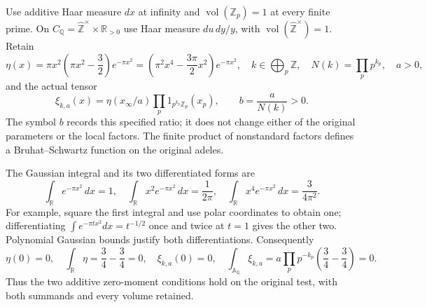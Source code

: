 \documentclass[11pt]{article}
\begin{document}
Use additive Haar measure $dx$ at infinity and
$\operatorname{vol}(\mathbb Z_p)=1$ at every finite prime. On
$C_{\mathbb Q}=\widehat{\mathbb Z}^{\times}\times\mathbb R_{>0}$
use Haar measure $du\,dy/y$, with
$\operatorname{vol}(\widehat{\mathbb Z}^{\times})=1$. Retain
\begin{equation}\tag{ETC1}
 \eta(x)=\pi x^2\left(\pi x^2-\frac32\right)e^{-\pi x^2}
        =\left(\pi^2x^4-\frac{3\pi}{2}x^2\right)e^{-\pi x^2},
 \quad k\in\bigoplus_p\mathbb Z,
 \quad N(k)=\prod_pp^{k_p},\quad a>0,
\end{equation}
and the actual tensor
\begin{equation}\tag{ETC2}
 \xi_{k,a}(x)=\eta(x_\infty/a)
                  \prod_p1_{p^{k_p}\mathbb Z_p}(x_p),
 \qquad b=\frac a{N(k)}>0.
\end{equation}
The symbol $b$ records this specified ratio; it does not change either
of the original parameters or the local factors. The finite product
of nonstandard factors defines a Bruhat--Schwartz function on the
original adeles.

The Gaussian integral and its two differentiated forms are
\begin{equation}\tag{ETC3}
 \int_{\mathbb R}e^{-\pi x^2}\,dx=1,\quad
 \int_{\mathbb R}x^2e^{-\pi x^2}\,dx=\frac1{2\pi},\quad
 \int_{\mathbb R}x^4e^{-\pi x^2}\,dx=\frac3{4\pi^2}.
\end{equation}
For example, square the first integral and use polar coordinates to
obtain one; differentiating
$\int e^{-\pi t x^2}dx=t^{-1/2}$ once and twice at $t=1$
gives the other two. Polynomial Gaussian bounds justify both
differentiations. Consequently
\begin{equation}\tag{ETC4}
 \eta(0)=0,\quad \int_{\mathbb R}\eta=\frac34-\frac34=0,
 \quad \xi_{k,a}(0)=0,\quad
 \int_{\mathbb A_{\mathbb Q}}\xi_{k,a}
 =a\prod_pp^{-k_p}\left(\frac34-\frac34\right)=0.
\end{equation}
Thus the two additive zero-moment conditions hold on the original
test, with both summands and every volume retained.
\end{document}
